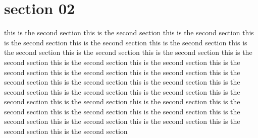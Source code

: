 \section{section 02}
this is the second section
this is the second section
this is the second section
this is the second section
this is the second section
this is the second section
this is the second section
this is the second section
this is the second section
this is the second section
this is the second section
this is the second section
this is the second section
this is the second section
this is the second section
this is the second section
this is the second section
this is the second section
this is the second section
this is the second section
this is the second section
this is the second section
this is the second section
this is the second section
this is the second section
this is the second section
this is the second section
this is the second section
this is the second section
this is the second section
this is the second section
this is the second section